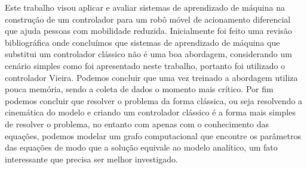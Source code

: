 
\label{Cap:Conclusao}

Este trabalho visou aplicar e avaliar sistemas de aprendizado de máquina
na construção de um controlador para um robô móvel de acionamento diferencial
que ajuda pessoas com mobilidade reduzida. Inicialmente foi feito uma
revisão bibliográfica onde concluímos que sistemas de aprendizado de
máquina que substitui um controlador clássico não é uma boa abordagem,
considerando um cenário simples como foi apresentado neste trabalho,
portanto foi utilizado o controlador Vieira. 
Podemos concluir que uma vez treinado a abordagem utiliza pouca memória,
sendo a coleta de dados o momento mais crítico. Por fim podemos concluir
que resolver o problema da forma clássica, ou seja resolvendo a cinemática
do modelo e criando um controlador clássico é a forma mais simples
de resolver o problema, no entanto com apenas com o conhecimento das equações,
podemos modelar um grafo computacional que encontre os parâmetros das
equações de modo que a solução equivale ao modelo analítico, um fato
interessante que precisa ser melhor investigado.